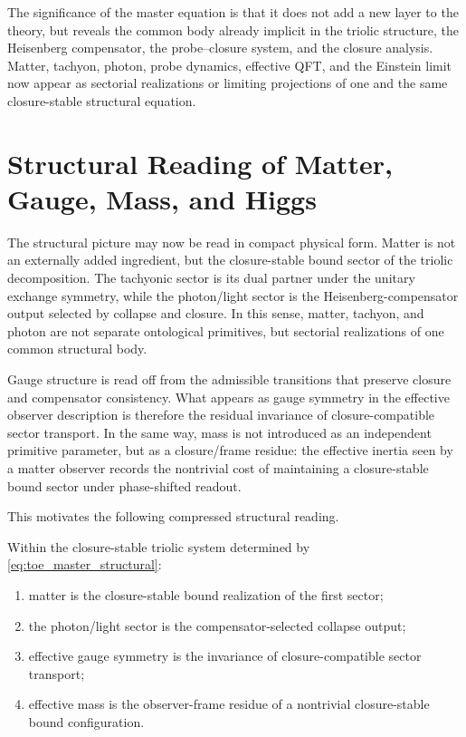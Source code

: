 The significance of the master equation is that it does not add a new layer to
the theory, but reveals the common body already implicit in the triolic
structure, the Heisenberg compensator, the probe--closure system, and the
closure analysis. Matter, tachyon, photon, probe dynamics, effective QFT, and
the Einstein limit now appear as sectorial realizations or limiting
projections of one and the same closure-stable structural equation.

\section{Structural Reading of Matter, Gauge, Mass, and Higgs}
\label{sec:structural-reading-physics}

The structural picture may now be read in compact physical form. Matter is not
an externally added ingredient, but the closure-stable bound sector of the
triolic decomposition. The tachyonic sector is its dual partner under the
unitary exchange symmetry, while the photon/light sector is the
Heisenberg-compensator output selected by collapse and closure. In this sense,
matter, tachyon, and photon are not separate ontological primitives, but
sectorial realizations of one common structural body.

Gauge structure is read off from the admissible transitions that preserve
closure and compensator consistency. What appears as gauge symmetry in the
effective observer description is therefore the residual invariance of
closure-compatible sector transport. In the same way, mass is not introduced
as an independent primitive parameter, but as a closure/frame residue: the
effective inertia seen by a matter observer records the nontrivial cost of
maintaining a closure-stable bound sector under phase-shifted readout.

This motivates the following compressed structural reading.

\begin{proposition}
\label{prop:structural-matter-gauge-mass}
Within the closure-stable triolic system determined by
\eqref{eq:toe_master_structural}:
\begin{enumerate}
\item matter is the closure-stable bound realization of the first sector;
\item the photon/light sector is the compensator-selected collapse output;
\item effective gauge symmetry is the invariance of closure-compatible
sector transport;
\item effective mass is the observer-frame residue of a nontrivial
closure-stable bound configuration.
\end{enumerate}
\end{proposition}

